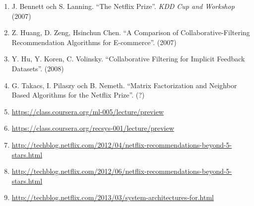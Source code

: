 \documentclass[11pt]{article}
\begin{document}
\begin{enumerate}

    \item J. Bennett och S. Lanning. ``The Netflix Prize''. \textit{KDD Cup and Workshop} (2007)

    \item Z. Huang, D. Zeng, Hsinchun Chen. ``A Comparison of Collaborative-Filtering Recommendation Algorithms for E-commerce''. (2007)

    \item Y. Hu, Y. Koren, C.  Volinsky. ``Collaborative Filtering for Implicit Feedback Datasets''. (2008)

    \item G. Takacs, I. Pilaszy och B. Nemeth. ``Matrix Factorization and Neighbor Based Algorithms for the Netflix Prize''. (?)

    \item \url{https://class.coursera.org/ml-005/lecture/preview}
    \item \url{https://class.coursera.org/recsys-001/lecture/preview}

    \item \url{http://techblog.netflix.com/2012/04/netflix-recommendations-beyond-5-stars.html}
    \item \url{http://techblog.netflix.com/2012/06/netflix-recommendations-beyond-5-stars.html}
    \item \url{http://techblog.netflix.com/2013/03/system-architectures-for.html}


\end{enumerate}

\newpage
\end{document}

